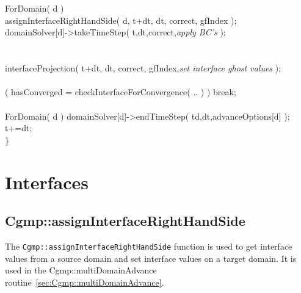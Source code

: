 \documentclass[11pt]{article}
\newcommand{\green}{\color{green}}
\begin{document}
\begin{flushleft}
\ic \\
\ic       {} \\
\ic       ForDomain( d )\\
\id        assignInterfaceRightHandSide( d, t+dt, dt, correct, gfIndex );  \\
\id        domainSolver[d]->takeTimeStep( t,dt,correct,{\em\green apply BC's} );  \\
\ic \\
\ic       {} \\
\ic       interfaceProjection( t+dt, dt, correct, gfIndex,{\em\green set interface ghost values} ); \\
\ic \\
\ic      \IF( hasConverged = checkInterfaceForConvergence( .. ) ) break; \\
\ib \\
\ib    ForDomain( d ) domainSolver[d]->endTimeStep( td,dt,advanceOptions[d] ); \\
\ib    t+=dt;  \\
\}
\end{flushleft}

\clearpage
\section{Interfaces }

\subsection{Cgmp::assignInterfaceRightHandSide} \label{sec:Cgmp::assignInterfaceRightHandSide}

The {\tt Cgmp::assignInterfaceRightHandSide} function is used to get interface values from a source
domain and set interface values on a target domain. It is used in the Cgmp::multiDomainAdvance routine~\ref{sec:Cgmp::multiDomainAdvance}.
\end{document}

